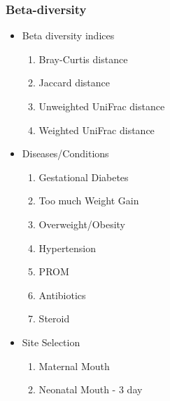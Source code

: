 \documentclass{beamer}
\begin{document}
    \begin{frame}
        \frametitle{Beta-diversity}

        \begin{itemize}
            \item Beta diversity indices
            \begin{enumerate}
                \item Bray-Curtis distance
                \item Jaccard distance
                \item Unweighted UniFrac distance
                \item Weighted UniFrac distance
            \end{enumerate}

            \item Diseases/Conditions
            \begin{enumerate}
                \item Gestational Diabetes
                \item Too much Weight Gain
                \item Overweight/Obesity
                \item Hypertension
                \item PROM
                \item Antibiotics
                \item Steroid
            \end{enumerate}

            \item Site Selection
            \begin{enumerate}
                \item Maternal Mouth
                \item Neonatal Mouth - 3 day
            \end{enumerate}
        \end{itemize}
    \end{frame}
\end{document}
